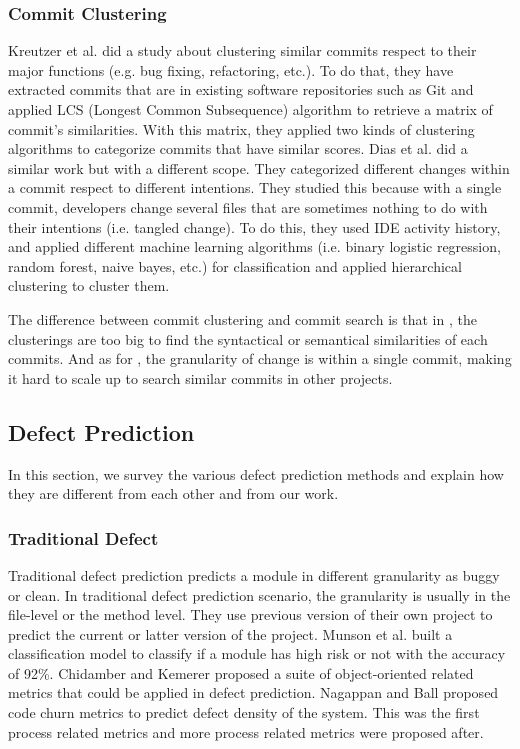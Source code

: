 \subsubsection{Commit Clustering}
Kreutzer et al. \cite{kreutzer2016automatic} did a study about clustering similar commits respect to their major functions (e.g. bug fixing, refactoring, etc.).
To do that, they have extracted commits that are in existing software repositories such as Git and applied LCS (Longest Common Subsequence) algorithm to retrieve a matrix of commit's similarities.
With this matrix, they applied two kinds of clustering algorithms to categorize commits that have similar scores.
Dias et al. \cite{dias2015untangling} did a similar work but with a different scope.
They categorized different changes within a commit respect to different intentions.
They studied this because with a single commit, developers change several files that are sometimes nothing to do with their intentions (i.e. tangled change).
To do this, they used IDE activity history, and applied different machine learning algorithms (i.e. binary logistic regression, random forest, naive bayes, etc.) for classification and applied hierarchical clustering to cluster them.

The difference between commit clustering and commit search is that in \cite{kreutzer2016automatic}, the clusterings are too big to find the syntactical or semantical similarities of each commits. And as for \cite{dias2015untangling}, the granularity of change is within a single commit, making it hard to scale up to search similar commits in other projects.

\subsection{Defect Prediction}
In this section, we survey the various defect prediction methods and explain how they are different from each other and from our work.
\subsubsection{Traditional Defect}
Traditional defect prediction predicts a module in different granularity as buggy or clean.
In traditional defect prediction scenario, the granularity is usually in the file-level or the method level.
They use previous version of their own project to predict the current or latter version of the project.
Munson et al. \cite{munson1992detection} built a classification model to classify if a module has high risk or not with the accuracy of 92\%.
Chidamber and Kemerer \cite{chidamber1994metrics} proposed a suite of object-oriented related metrics that could be applied in defect prediction.
Nagappan and Ball \cite{nagappan2005use} proposed code churn metrics to predict defect density of the system.
This was the first process related metrics and more process related metrics were proposed after.

